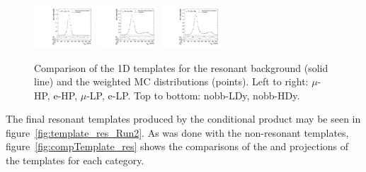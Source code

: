 \begin{figure}[htbp]
  \includegraphics[width=0.2\textwidth]{fig/2Dfit/templateVsReco_res_r0_MJ_e_HP_nobb_HDy.pdf}
  \includegraphics[width=0.2\textwidth]{fig/2Dfit/templateVsReco_res_r0_MJ_mu_LP_nobb_HDy.pdf}
  \includegraphics[width=0.2\textwidth]{fig/2Dfit/templateVsReco_res_r0_MJ_e_LP_nobb_HDy.pdf}\\
  \caption{
    Comparison of the 1D \MJ templates for the resonant background (solid line) and the weighted MC distributions (points).
    Left to right: $\mu$-HP, e-HP, $\mu$-LP, e-LP.
    Top to bottom: nobb-LDy, nobb-HDy.
  }
  \label{fig:1dtemplateVsReco_res_MJ_Run2}
\end{figure}

The final resonant templates produced by the conditional product may be seen in figure~\ref{fig:template_res_Run2}.
As was done with the non-resonant templates, figure~\ref{fig:compTemplate_res} shows the comparisons of the \MVV and \MJ projections of the templates for each category.


